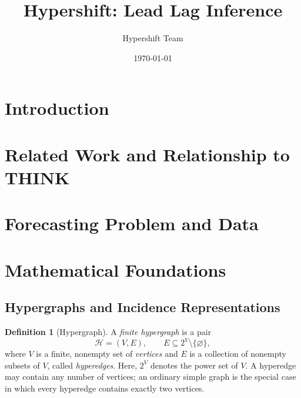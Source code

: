 \documentclass{article}
\title{Hypershift: Lead Lag Inference}
\author{Hypershift Team} %
\date{\today}
\theoremstyle{definition}
\newtheorem{definition}{Definition}
\theoremstyle{plain}
\begin{document}
\maketitle

\begin{abstract}
\end{abstract}


\section{Introduction}


\section{Related Work and Relationship to THINK}

\section{Forecasting Problem and Data}

\section{Mathematical Foundations}

\subsection{Hypergraphs and Incidence Representations}
\begin{definition}[Hypergraph]
\label{def:hypergraph}
A \emph{finite hypergraph} is a pair
\[
  \mathcal{H} = (V,E),
  \qquad E \subseteq 2^V \setminus \{\varnothing\},
\]
where $V$ is a finite, nonempty set of \emph{vertices} and $E$ is a
collection of nonempty subsets of $V$, called \emph{hyperedges}.
Here, $2^V$ denotes the power set of $V$. A hyperedge may contain any
number of vertices; an ordinary simple graph is the special case in which
every hyperedge contains exactly two vertices.
\end{definition}
\end{document}
